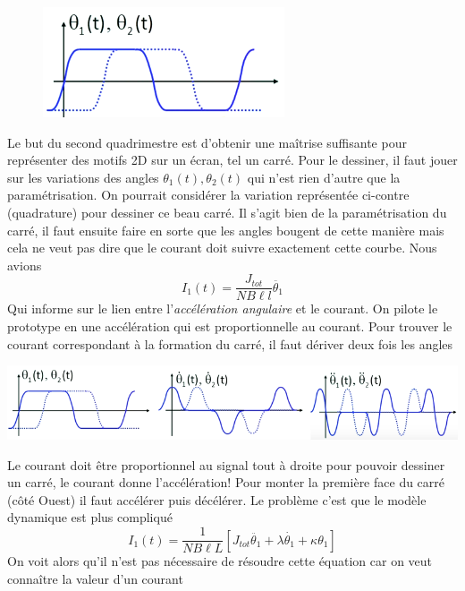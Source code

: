 \begin{figure}
\vspace{-5mm}
\includegraphics[scale=0.45]{ch1/image7.png}
\end{figure}
Le but du second quadrimestre est d'obtenir une maîtrise suffisante pour représenter des motifs 2D sur un écran, 
tel un carré. Pour le dessiner, il faut jouer sur les variations des angles $\theta_1(t), \theta_2(t)$ qui n'est
rien d'autre que la paramétrisation. On pourrait considérer la variation représentée ci-contre (quadrature) pour dessiner ce beau carré. Il s'agit bien de la paramétrisation du carré, il faut ensuite faire en sorte que les 
angles bougent de cette manière mais cela ne veut pas dire que le courant doit suivre exactement cette courbe. 
Nous avions
\begin{equation}
I_1(t) = \dfrac{J_{tot}}{NB\ell l}\ddot{\theta_1}
\end{equation}
Qui informe sur le lien entre l'\textit{accélération angulaire} et le courant. On pilote le prototype en une 
accélération qui est proportionnelle au courant. Pour trouver le courant correspondant à la formation du carré, 
il faut dériver deux fois les angles
\begin{center}
\includegraphics[scale=0.5]{ch1/image8.png}
\end{center}
Le courant doit être proportionnel au signal tout à droite pour pouvoir dessiner un carré, le courant donne 
l'accélération! Pour monter la première face du carré (côté Ouest) il faut accélérer puis décélérer. Le problème
c'est que le modèle dynamique est plus compliqué
\begin{equation}
I_1(t)= \dfrac{1}{NB\ell L}[J_{tot}\ddot{\theta_1}+\lambda\dot{\theta_1}+\kappa\theta_1]
\end{equation}
On voit alors qu'il n'est pas nécessaire de résoudre cette équation car on veut connaître la valeur d'un courant
